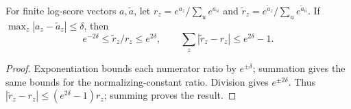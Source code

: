 \begin{proposition}
\label{prop:softmax-perturbation}
For finite log-score vectors $a,\tilde a$, let
$r_z=e^{a_z}/\sum_u e^{a_u}$ and
$\tilde r_z=e^{\tilde a_z}/\sum_u e^{\tilde a_u}$.
If $\max_z|a_z-\tilde a_z|\le\delta$, then
\[
 e^{-2\delta}\le\tilde r_z/r_z\le e^{2\delta},\qquad
 \sum_z|\tilde r_z-r_z|\le e^{2\delta}-1.
\]
\end{proposition}
\begin{proof}
Exponentiation bounds each numerator ratio by $e^{\pm\delta}$; summation
gives the same bounds for the normalizing-constant ratio. Division gives
$e^{\pm2\delta}$. Thus
$|\tilde r_z-r_z|\le(e^{2\delta}-1)r_z$; summing proves the result.
\end{proof}
